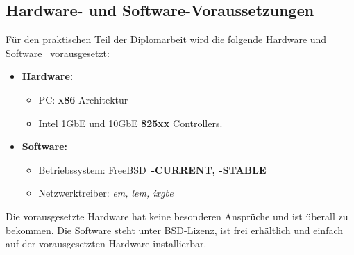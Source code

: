 \subsection{Hardware- und Software-Voraussetzungen} \label{sec:hwsw_voraus}
{ 
Für den praktischen Teil der Diplomarbeit wird die folgende Hardware und
Software ~vorausgesetzt:
}
\begin{itemize}
 	\item \textbf{Hardware:}
		\begin{itemize}
			\item PC: \textbf{x86}-Architektur
 			\item Intel 1GbE und 10GbE \textbf{825xx} Controllers.
		\end{itemize}
	\item \textbf{Software:}
		\begin{itemize}
			\item Betriebssystem: FreeBSD~\textbf{-CURRENT, -STABLE}
			\item Netzwerktreiber: \emph{em, lem, ixgbe}
		\end{itemize}
\end{itemize}
Die vorausgesetzte Hardware hat keine besonderen Ansprüche und ist überall zu
bekommen.  Die Software steht unter BSD-Lizenz, ist frei erhältlich und einfach
auf der vorausgesetzten Hardware installierbar. 
